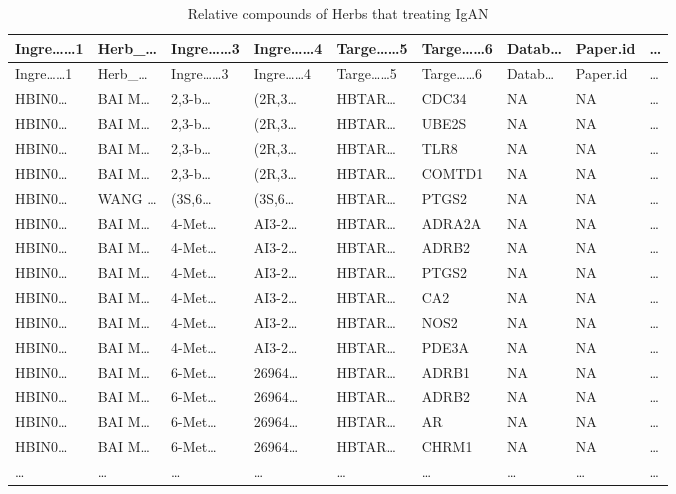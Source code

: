 \documentclass[
]{article}
\begin{document}
\begin{longtable}[]{@{}lllllllll@{}}
\caption{\label{tab:relative-compounds-of-Herbs-that-treating-IgAN}Relative compounds of Herbs that treating IgAN}\tabularnewline
\toprule
Ingre\ldots\ldots1 & Herb\_\ldots{} & Ingre\ldots\ldots3 & Ingre\ldots\ldots4 & Targe\ldots\ldots5 & Targe\ldots\ldots6 & Datab\ldots{} & Paper.id & \ldots{}\tabularnewline
\midrule
\endfirsthead
\toprule
Ingre\ldots\ldots1 & Herb\_\ldots{} & Ingre\ldots\ldots3 & Ingre\ldots\ldots4 & Targe\ldots\ldots5 & Targe\ldots\ldots6 & Datab\ldots{} & Paper.id & \ldots{}\tabularnewline
\midrule
\endhead
HBIN0\ldots{} & BAI M\ldots{} & 2,3-b\ldots{} & (2R,3\ldots{} & HBTAR\ldots{} & CDC34 & NA & NA & \ldots{}\tabularnewline
HBIN0\ldots{} & BAI M\ldots{} & 2,3-b\ldots{} & (2R,3\ldots{} & HBTAR\ldots{} & UBE2S & NA & NA & \ldots{}\tabularnewline
HBIN0\ldots{} & BAI M\ldots{} & 2,3-b\ldots{} & (2R,3\ldots{} & HBTAR\ldots{} & TLR8 & NA & NA & \ldots{}\tabularnewline
HBIN0\ldots{} & BAI M\ldots{} & 2,3-b\ldots{} & (2R,3\ldots{} & HBTAR\ldots{} & COMTD1 & NA & NA & \ldots{}\tabularnewline
HBIN0\ldots{} & WANG \ldots{} & (3S,6\ldots{} & (3S,6\ldots{} & HBTAR\ldots{} & PTGS2 & NA & NA & \ldots{}\tabularnewline
HBIN0\ldots{} & BAI M\ldots{} & 4-Met\ldots{} & AI3-2\ldots{} & HBTAR\ldots{} & ADRA2A & NA & NA & \ldots{}\tabularnewline
HBIN0\ldots{} & BAI M\ldots{} & 4-Met\ldots{} & AI3-2\ldots{} & HBTAR\ldots{} & ADRB2 & NA & NA & \ldots{}\tabularnewline
HBIN0\ldots{} & BAI M\ldots{} & 4-Met\ldots{} & AI3-2\ldots{} & HBTAR\ldots{} & PTGS2 & NA & NA & \ldots{}\tabularnewline
HBIN0\ldots{} & BAI M\ldots{} & 4-Met\ldots{} & AI3-2\ldots{} & HBTAR\ldots{} & CA2 & NA & NA & \ldots{}\tabularnewline
HBIN0\ldots{} & BAI M\ldots{} & 4-Met\ldots{} & AI3-2\ldots{} & HBTAR\ldots{} & NOS2 & NA & NA & \ldots{}\tabularnewline
HBIN0\ldots{} & BAI M\ldots{} & 4-Met\ldots{} & AI3-2\ldots{} & HBTAR\ldots{} & PDE3A & NA & NA & \ldots{}\tabularnewline
HBIN0\ldots{} & BAI M\ldots{} & 6-Met\ldots{} & 26964\ldots{} & HBTAR\ldots{} & ADRB1 & NA & NA & \ldots{}\tabularnewline
HBIN0\ldots{} & BAI M\ldots{} & 6-Met\ldots{} & 26964\ldots{} & HBTAR\ldots{} & ADRB2 & NA & NA & \ldots{}\tabularnewline
HBIN0\ldots{} & BAI M\ldots{} & 6-Met\ldots{} & 26964\ldots{} & HBTAR\ldots{} & AR & NA & NA & \ldots{}\tabularnewline
HBIN0\ldots{} & BAI M\ldots{} & 6-Met\ldots{} & 26964\ldots{} & HBTAR\ldots{} & CHRM1 & NA & NA & \ldots{}\tabularnewline
\ldots{} & \ldots{} & \ldots{} & \ldots{} & \ldots{} & \ldots{} & \ldots{} & \ldots{} & \ldots{}\tabularnewline
\bottomrule
\end{longtable}
\end{document}
